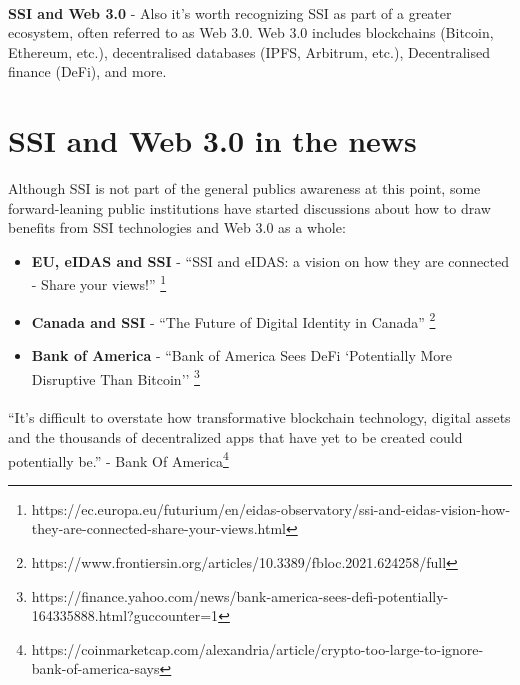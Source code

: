 \paragraph{}

\textbf{SSI and Web 3.0} - Also it's worth recognizing SSI as part of a greater ecosystem, often referred to as Web 3.0. Web 3.0 includes blockchains (Bitcoin, Ethereum, etc.), decentralised databases (IPFS, Arbitrum, etc.), Decentralised finance (DeFi), and more.




\pagebreak




\hypertarget{ssi-and-web-3.0-in-the-news}{%
\section{SSI and Web 3.0 in the
news}\label{ssi-and-web-3.0-in-the-news}}

Although SSI is not part of the general publics awareness at this point,
some forward-leaning public institutions have started discussions about
how to draw benefits from SSI technologies and Web 3.0 as a whole:

\begin{itemize}
\tightlist
\item
    \textbf{EU, eIDAS and SSI} - ``SSI and eIDAS: a vision on how they are connected - Share your views!'' \footnote{https://ec.europa.eu/futurium/en/eidas-observatory/ssi-and-eidas-vision-how-they-are-connected-share-your-views.html}
\item
    \textbf{Canada and SSI} - ``The Future of Digital Identity in Canada'' \footnote{https://www.frontiersin.org/articles/10.3389/fbloc.2021.624258/full}
\item
    \textbf{Bank of America} - ``Bank of America Sees DeFi `Potentially More Disruptive Than Bitcoin'' \footnote{https://finance.yahoo.com/news/bank-america-sees-defi-potentially-164335888.html?guccounter=1}
\end{itemize}

\paragraph{}

``It's difficult to overstate how transformative blockchain
technology, digital assets and the thousands of decentralized apps that
have yet to be created could potentially be.'' - Bank Of America\footnote{https://coinmarketcap.com/alexandria/article/crypto-too-large-to-ignore-bank-of-america-says}




